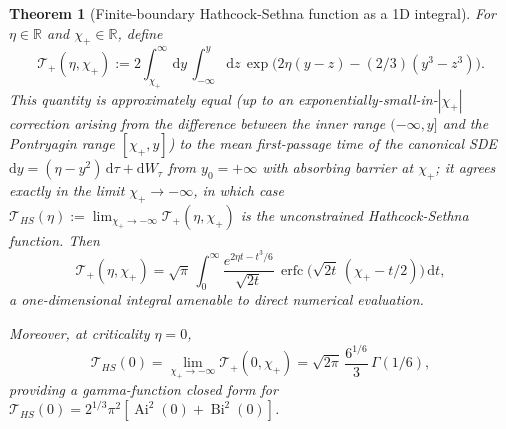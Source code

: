 \documentclass[11pt,a4paper]{article}
\theoremstyle{plain}
\newtheorem{theorem}{Theorem}[section]
\theoremstyle{definition}
\newcommand{\R}{\mathbb{R}}
\renewcommand{\d}{\mathrm{d}}
\newcommand{\Ai}{\operatorname{Ai}}
\newcommand{\Bi}{\operatorname{Bi}}
\begin{document}
\begin{theorem}[Finite-boundary Hathcock-Sethna function as a 1D integral]\label{thm:airy-finite}
For $\eta \in \R$ and $\chi_+ \in \R$, define
\begin{equation}
\mathcal T_+(\eta,\chi_+) := 2\int_{\chi_+}^\infty \d y\,\int_{-\infty}^y \d z\,\exp\!\big(2\eta(y-z) - (2/3)(y^3 - z^3)\big).
\label{eq:HS-finite}
\end{equation}
This quantity is approximately equal (up to an exponentially-small-in-$|\chi_+|$ correction arising from the difference between the inner range $(-\infty, y]$ and the Pontryagin range $[\chi_+, y]$) to the mean first-passage time of the canonical SDE $\d y = (\eta - y^2)\,\d\tau + \d W_\tau$ from $y_0 = +\infty$ with absorbing barrier at $\chi_+$; it agrees exactly in the limit $\chi_+ \to -\infty$, in which case $\mathcal T_{HS}(\eta) := \lim_{\chi_+ \to -\infty}\mathcal T_+(\eta,\chi_+)$ is the unconstrained Hathcock-Sethna function. Then
\begin{equation}
\boxed{\mathcal T_+(\eta, \chi_+) = \sqrt\pi\,\int_0^\infty \frac{e^{2\eta t - t^3/6}}{\sqrt{2t}}\,\operatorname{erfc}\!\big(\sqrt{2t}\,(\chi_+ - t/2)\big)\,\d t,}
\label{eq:T-plus-1D}
\end{equation}
a one-dimensional integral amenable to direct numerical evaluation.

Moreover, at criticality $\eta = 0$,
\begin{equation}
\mathcal T_{HS}(0) = \lim_{\chi_+\to-\infty}\mathcal T_+(0,\chi_+) = \sqrt{2\pi}\,\frac{6^{1/6}}{3}\,\Gamma(1/6),
\label{eq:T-crit-gamma}
\end{equation}
providing a gamma-function closed form for $\mathcal T_{HS}(0) = 2^{1/3}\pi^2[\Ai^2(0) + \Bi^2(0)]$.
\end{theorem}
\end{document}
